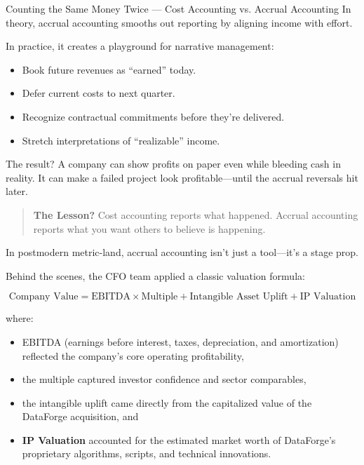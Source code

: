 \begin{HistoricalSidebar}{Counting the Same Money Twice — Cost Accounting vs. Accrual Accounting}
In theory, accrual accounting smooths out reporting by aligning income with effort.  

\medskip

In practice, it creates a playground for narrative management:

\begin{itemize}
    \item Book future revenues as “earned” today.
    \item Defer current costs to next quarter.
    \item Recognize contractual commitments before they’re delivered.
    \item Stretch interpretations of “realizable” income.
\end{itemize}

\medskip

The result?  
A company can show profits on paper even while bleeding cash in reality.  
It can make a failed project look profitable—until the accrual reversals hit later.

\begin{quote}
\textbf{The Lesson?} Cost accounting reports what happened. Accrual accounting reports what you want others to believe is happening.
\end{quote}

In postmodern metric-land, accrual accounting isn’t just a tool—it’s a stage prop.

\end{HistoricalSidebar}

\medskip

Behind the scenes, the CFO team applied a classic valuation formula:

\[
\text{Company Value} = \text{EBITDA} \times \text{Multiple} + \text{Intangible Asset Uplift} + \text{IP Valuation}
\]

where:
\begin{itemize}
    \item EBITDA (earnings before interest, taxes, depreciation, and amortization) reflected the company’s core operating profitability,
    \item the multiple captured investor confidence and sector comparables,
    \item the intangible uplift came directly from the capitalized value of the DataForge acquisition, and
    \item \textbf{IP Valuation} accounted for the estimated market worth of DataForge’s proprietary algorithms, scripts, and technical innovations.
\end{itemize}

